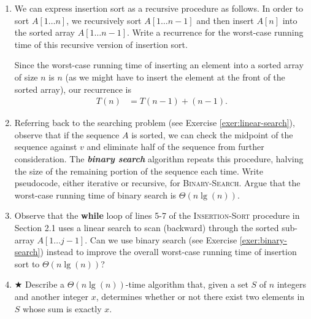 \documentclass[Chapter02]{subfiles}
\begin{document}
\begin{enumerate}[leftmargin=\labelsep]
		\item We can express insertion sort as a recursive procedure as follows. In order to sort $A[1 \dots n]$, we recursively sort $A[1 \dots n-1]$ and then insert $A[n]$ into the sorted array $A[1 \dots n-1]$. Write a recurrence for the worst-case running time of this recursive version of insertion sort.
		\begin{answer}
			Since the worst-case running time of inserting an element into a sorted array of size $n$ is $n$ (as we might have to insert the element at the front of the sorted array), our recurrence is
			\begin{align*}
				T(n) &= T(n - 1) + (n - 1).
			\end{align*}
		\end{answer}

		\item \label{exer:binary-search} Referring back to the searching problem (see Exercise \ref{exer:linear-search}), observe that if the sequence $A$ is sorted, we can check the midpoint of the sequence against $v$ and eliminate half of the sequence from further consideration. The \textbf{\textit{binary search}} algorithm repeats this procedure, halving the size of the remaining portion of the sequence each time. Write pseudocode, either iterative or recursive, for \textsc{Binary-Search}. Argue that the worst-case running time of binary search is $\Theta(n \lg(n))$.
		\begin{answer}
			
		\end{answer}

		\item Observe that the \textbf{while} loop of lines 5-7 of the \textsc{Insertion-Sort} procedure in Section 2.1 uses a linear search to scan (backward) through the sorted sub-array $A[1 \dots j - 1]$. Can we use binary search (see Exercise \ref{exer:binary-search}) instead to improve the overall worst-case running time of insertion sort to $\Theta(n \lg(n))$?
		\begin{answer}
			
		\end{answer}

		\item $\bigstar$ Describe a $\Theta(n \lg(n))$-time algorithm that, given a set $S$ of $n$ integers and another integer $x$, determines whether or not there exist two elements in $S$ whose sum is exactly $x$.
		\begin{answer}
			
		\end{answer}

		
	\end{enumerate}
\end{document}
